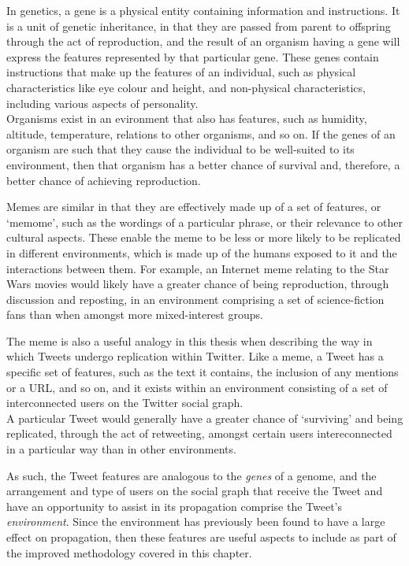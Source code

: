In genetics, a gene is a physical entity containing information and instructions. It is a unit of genetic inheritance, in that they are passed from parent to offspring through the act of reproduction, and the result of an organism having a gene will express the features represented by that particular gene. These genes contain instructions that make up the features of an individual, such as physical characteristics like eye colour and height, and non-physical characteristics, including various aspects of personality.\\
Organisms exist in an evironment that also has features, such as humidity, altitude, temperature, relations to other organisms, and so on. If the genes of an organism are such that they cause the individual to be well-suited to its environment, then that organism has a better chance of survival and, therefore, a better chance of achieving reproduction.

Memes are similar in that they are effectively made up of a set of features, or `memome', such as the wordings of a particular phrase, or their relevance to other cultural aspects. These enable the meme to be less or more likely to be replicated in different environments, which is made up of the humans exposed to it and the interactions between them. For example, an Internet meme relating to the Star Wars movies would likely have a greater chance of being reproduction, through discussion and reposting, in an environment comprising a set of science-fiction fans than when amongst more mixed-interest groups.

The meme is also a useful analogy in this thesis when describing the way in which Tweets undergo replication within Twitter. Like a meme, a Tweet has a specific set of features, such as the text it contains, the inclusion of any mentions or a URL, and so on, and it exists within an environment consisting of a set of interconnected users on the Twitter social graph.\\
A particular Tweet would generally have a greater chance of `surviving' and being replicated, through the act of retweeting, amongst certain users intereconnected in a particular way than in other environments.

As such, the Tweet features are analogous to the \textit{genes} of a genome, and the arrangement and type of users on the social graph that receive the Tweet and have an opportunity to assist in its propagation comprise the Tweet's \textit{environment}. Since the environment has previously been found to have a large effect on propagation, then these features are useful aspects to include as part of the improved methodology covered in this chapter.


